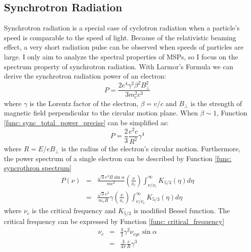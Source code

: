 \documentclass[12pt]{report}
\begin{document}
    \subsection{Synchrotron Radiation}
      Synchrotron radiation is a special case of cyclotron radiation when a particle's
      speed is comparable to the speed of light. Because of the relativistic beaming 
      effect, a very short radiation pulse can be observed when speeds of particles are
      large. I only aim to analyze the spectral properties of MSPs, so I focus on the 
      spectrum property of synchrotron radiation. 
      With Larmor's Formula we can derive the synchrotron radiation power of an electron:
      \begin{equation}
        \label{func: sync_total_power_precise}
        P = \frac{2e^4\gamma^2\beta^2B_{\perp}^2}{3m_e^2c^3} 
      \end{equation}
      where $\gamma$ is the Lorentz factor of the electron, $\beta=v/c$ and $B_{\perp}$ 
      is the strength of magnetic field perpendicular to the circular motion plane. 
      When $\beta \sim 1$, Function \ref{func: sync_total_power_precise} can be 
      simplified as:
      \begin{equation}
        \label{func: sync_total_power_simplified}
        P = \frac{2}{3}\frac{e^2c}{R^2}\gamma^4
      \end{equation}
      where $R = E / e B_{\perp}$ is the radius of the electron's circular motion. 
      Furthermore, the power spectrum of a single electron  
      can be described by Function \ref{func: syncrothron spectrum}
      \begin{eqnarray}
        \label{func: syncrothron spectrum}
        P\left(\nu\right) &=& \frac{\sqrt{3} e^3 B \sin{\alpha}}{m c^2} 
          \left(\frac{\nu}{\nu_c}\right) \int_{\nu / \nu_c}^{\infty} K_{5/3}\left(\eta \right)d\eta  \nonumber \\
          &=& \frac{\sqrt{3}e^2}{m_eR}\gamma \left(\frac{\nu}{\nu_c}\right) \int_{\nu / \nu_c}^{\infty} K_{5/3}\left(\eta \right)d\eta
      \end{eqnarray}
      where $\nu_c$ is the critical frequency and $K_{5/3}$ is modified Bessel function. 
      The critical frequency can be expressed by Function \ref{func: critical_frequency}
      \begin{eqnarray}
        \label{func: critical_frequency}
        \nu_c &=& \frac{3}{2} \gamma^2 \nu_{cyc} \sin{\alpha} \nonumber \\
              &=& \frac{3}{4\pi} \frac{c}{R} \gamma^3 
      \end{eqnarray} 
\end{document}
